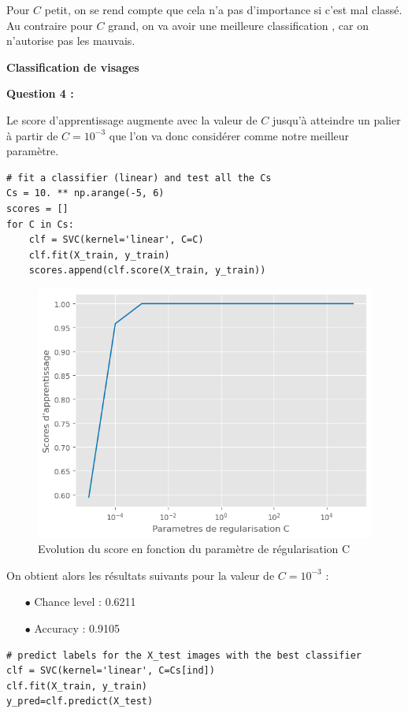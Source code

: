 \documentclass[10pt,a4paper]{article}
\begin{document}
Pour $C$ petit, on se rend compte que cela n'a pas d'importance si c'est mal classé. Au contraire pour $C$ grand, on va avoir une meilleure classification , car on n'autorise pas les mauvais.

\bigskip

\begin{large}
\textbf{Classification de visages}
\end{large}


\textbf{Question 4 :}

Le score d'apprentissage augmente avec la valeur de $C$ jusqu'à atteindre un palier à partir de $C=10^{-3}$ que l'on va donc considérer comme notre meilleur paramètre.

\begin{lstlisting}
# fit a classifier (linear) and test all the Cs
Cs = 10. ** np.arange(-5, 6)
scores = []
for C in Cs:
    clf = SVC(kernel='linear', C=C)
    clf.fit(X_train, y_train)
    scores.append(clf.score(X_train, y_train))
\end{lstlisting}

\begin{figure}[H]
\centerline{\includegraphics[width=0.6\linewidth]{images/score_vs_C.png}}
\caption{Evolution du score en fonction du paramètre de régularisation C}
\label{fig:sc_vs_c}
\end{figure}

On obtient alors les résultats suivants pour la valeur de $C=10^{-3}$ : 

\begin{itemize}
\item[$\bullet$] Chance level : 0.6211
\item[$\bullet$] Accuracy : 0.9105
\end{itemize}

\begin{lstlisting}
# predict labels for the X_test images with the best classifier
clf = SVC(kernel='linear', C=Cs[ind])
clf.fit(X_train, y_train)
y_pred=clf.predict(X_test)
\end{lstlisting}
\end{document}

